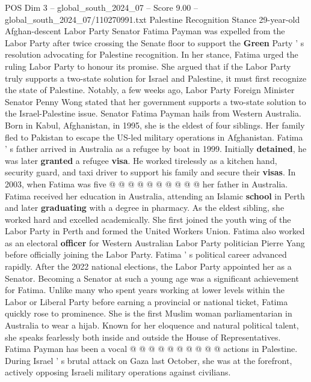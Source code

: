 \begin{textsample}{POS Dim 3 – global\_south\_2024\_07 – Score 9.00 – global\_south\_2024\_07/110270991.txt}  \label{ex:f3_pos_315}
Palestine Recognition Stance 29-year-old Afghan-descent Labor Party Senator Fatima Payman was expelled from the Labor Party after twice crossing the Senate floor to support the \textbf{Green} Party ' s resolution advocating for Palestine recognition.
In her stance, Fatima urged the ruling Labor Party to honour its promise.
She argued that if the Labor Party truly supports a two-state solution for Israel and Palestine, it must first recognize the state of Palestine.
Notably, a few weeks ago, Labor Party Foreign Minister Senator Penny Wong stated that her government supports a two-state solution to the Israel-Palestine issue.
Senator Fatima Payman hails from Western Australia.
Born in Kabul, Afghanistan, in 1995, she is the eldest of four siblings.
Her family fled to Pakistan to escape the US-led military operations in Afghanistan.
Fatima ' s father arrived in Australia as a refugee by boat in 1999.
Initially \textbf{detained}, he was later \textbf{granted} a refugee \textbf{visa}.
He worked tirelessly as a kitchen hand, security guard, and taxi driver to support his family and secure their \textbf{visas}.
In 2003, when Fatima was five @ @ @ @ @ @ @ @ @ @ her father in Australia.
Fatima received her education in Australia, attending an Islamic \textbf{school} in Perth and later \textbf{graduating} with a degree in pharmacy.
As the eldest sibling, she worked hard and excelled academically.
She first joined the youth wing of the Labor Party in Perth and formed the United Workers Union.
Fatima also worked as an electoral \textbf{officer} for Western Australian Labor Party politician Pierre Yang before officially joining the Labor Party.
Fatima ' s political career advanced rapidly.
After the 2022 national elections, the Labor Party appointed her as a Senator.
Becoming a Senator at such a young age was a significant achievement for Fatima.
Unlike many who spent years working at lower levels within the Labor or Liberal Party before earning a provincial or national ticket, Fatima quickly rose to prominence.
She is the first Muslim woman parliamentarian in Australia to wear a hijab.
Known for her eloquence and natural political talent, she speaks fearlessly both inside and outside the House of Representatives.
Fatima Payman has been a vocal @ @ @ @ @ @ @ @ @ @ actions in Palestine.
During Israel ' s brutal attack on Gaza last October, she was at the forefront, actively opposing Israeli military operations against civilians.

\end{textsample}
